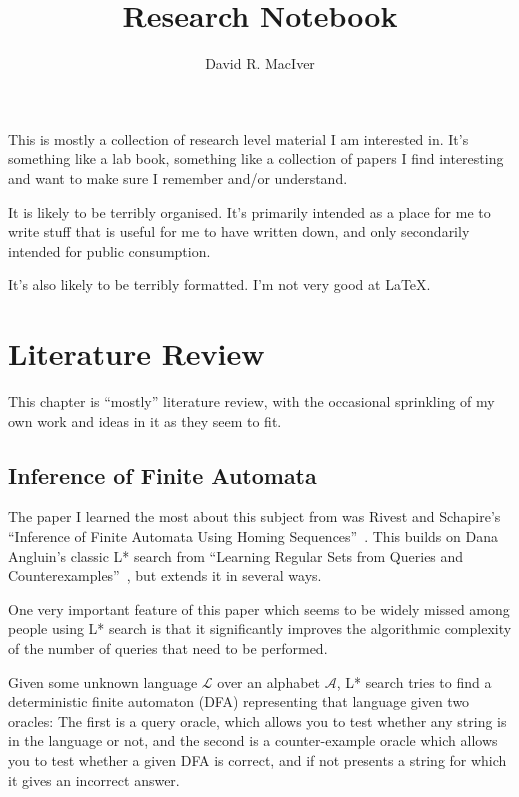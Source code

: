 \documentclass[a4paper]{book}
\title{Research Notebook}
\author{David R. MacIver}
\begin{document}
\maketitle

This is mostly a collection of research level material I am interested in.
It's something like a lab book,
something like a collection of papers I find interesting and want to make sure I remember and/or understand.

It is likely to be terribly organised.
It's primarily intended as a place for me to write stuff that is useful for me to have written down,
and only secondarily intended for public consumption.

It's also likely to be terribly formatted.
I'm not very good at \LaTeX.

\tableofcontents

\chapter{Literature Review}

This chapter is ``mostly'' literature review,
with the occasional sprinkling of my own work and ideas in it as they seem to fit.

\section{Inference of Finite Automata}\label{sec:langinference}

The paper I learned the most about this subject from was Rivest and Schapire's ``Inference of Finite Automata Using Homing Sequences''~\cite{DBLP:journals/iandc/RivestS93}.
This builds on Dana Angluin's classic L* search from ``Learning Regular Sets from Queries and Counterexamples''~\cite{DBLP:journals/iandc/Angluin87},
but extends it in several ways.

One very important feature of this paper which seems to be widely missed among people using L* search is that it significantly improves the algorithmic complexity of the number of queries that need to be performed.

Given some unknown language \(\mathcal{L}\) over an alphabet \(\mathcal{A}\),
L* search tries to find a deterministic finite automaton (DFA) representing that language given two oracles:
The first is a query oracle,
which allows you to test whether any string is in the language or not,
and the second is a counter-example oracle which allows you to test whether a given DFA is correct,
and if not presents a string for which it gives an incorrect answer.
\end{document}
